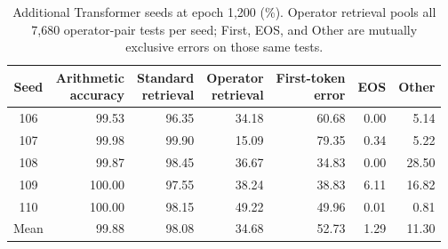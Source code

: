 \begin{table}[H]
\centering\revisioncolor\small
\setlength{\tabcolsep}{5pt}
\caption{Additional Transformer seeds at epoch 1,200 (\%). Operator retrieval pools all 7,680 operator-pair tests per seed; First, EOS, and Other are mutually exclusive errors on those same tests.}
\label{tab:additional-seeds-summary}
\begin{tabular}{@{}crrrrrr@{}}
\toprule
Seed & \shortstack{Arithmetic\\accuracy} & \shortstack{Standard\\retrieval} & \shortstack{Operator\\retrieval} & \shortstack{First-token\\error} & EOS & Other \\
\midrule
106 & 99.53 & 96.35 & 34.18 & 60.68 & 0.00 & 5.14 \\
107 & 99.98 & 99.90 & 15.09 & 79.35 & 0.34 & 5.22 \\
108 & 99.87 & 98.45 & 36.67 & 34.83 & 0.00 & 28.50 \\
109 & 100.00 & 97.55 & 38.24 & 38.83 & 6.11 & 16.82 \\
110 & 100.00 & 98.15 & 49.22 & 49.96 & 0.01 & 0.81 \\
\midrule Mean & 99.88 & 98.08 & 34.68 & 52.73 & 1.29 & 11.30 \\
\bottomrule
\end{tabular}
\end{table}
